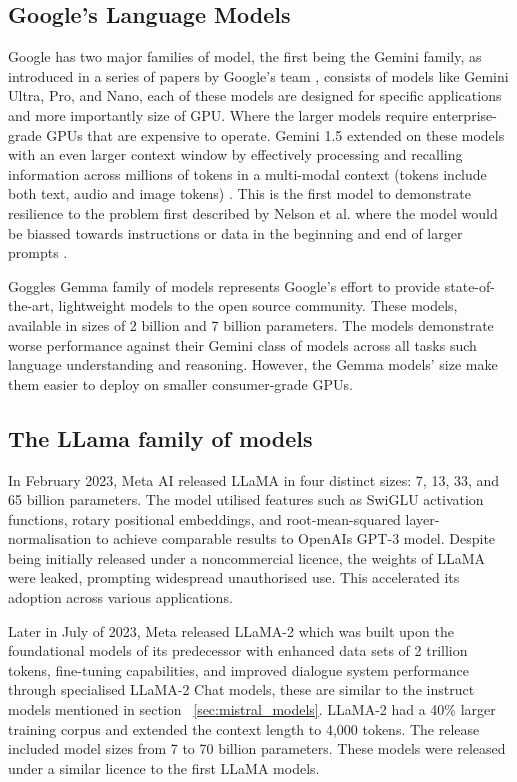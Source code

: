\subsection{Google's Language Models}


Google has two major families of model, the first being the Gemini family, as introduced in a series of papers by Google's team \cite{gemini_team_gemini_2024-1}, consists of models like Gemini Ultra, Pro, and Nano, each of these models are designed for specific applications and more importantly size of GPU. Where the larger models require enterprise-grade GPUs that are expensive to operate. Gemini 1.5 extended on these models with an even larger context window by effectively processing and recalling information across millions of tokens in a multi-modal context (tokens include both text, audio and image tokens) \cite{gemini_team_gemini_2024}. This is the first model to demonstrate resilience to the problem first described by Nelson et al. where the model would be biassed towards instructions or data in the beginning and end of larger prompts \cite{liu_lost_2023}.


Goggles Gemma family of models \cite{gemma_team_gemma_2024} represents Google's effort to provide state-of-the-art, lightweight models to the open source community. These models, available in sizes of 2 billion and 7 billion parameters. The models demonstrate worse performance against their Gemini class of models across all tasks such language understanding and reasoning. However, the Gemma models’ size make them easier to deploy on smaller consumer-grade GPUs.


\subsection{The LLama family of models}


In February 2023, Meta AI released LLaMA \cite{touvron_llama_2023-1} in four distinct sizes: 7, 13, 33, and 65 billion parameters. The model utilised features such as SwiGLU activation functions, rotary positional embeddings, and root-mean-squared layer-normalisation to achieve comparable results to OpenAIs GPT-3 model. Despite being initially released under a noncommercial licence, the weights of LLaMA were leaked, prompting widespread unauthorised use. This accelerated its adoption across various applications.


Later in July of 2023, Meta released LLaMA-2 \cite{touvron_llama_2023-2} which was built upon the foundational models of its predecessor with enhanced data sets of 2 trillion tokens, fine-tuning capabilities, and improved dialogue system performance through specialised LLaMA-2 Chat models, these are similar to the instruct models mentioned in section ~\ref{sec:mistral_models}. LLaMA-2 had a 40\% larger training corpus and extended the context length to 4,000 tokens. The release included model sizes from 7 to 70 billion parameters. These models were released under a similar licence to the first LLaMA models.


